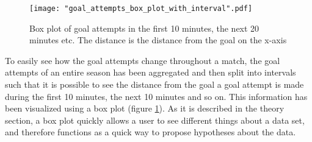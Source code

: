 \documentclass[Report.tex]{subfiles}
\begin{document}
\begin{figure}
\center
\texttt{[image: "goal\_attempts\_box\_plot\_with\_interval".pdf]}
\caption{Box plot of goal attempts in the first 10 minutes, the next 20 minutes etc. The distance is the distance from the goal on the x-axis}
\label{Fig:goal_attempts_box_plot}
\end{figure}

To easily see how the goal attempts change throughout a match, the goal attempts of an entire season has been aggregated and then
split into intervals such that it is possible to see the distance from the goal a goal attempt is made during the first 10 minutes, the next
10 minutes and so on. This information has been visualized using a box plot (figure \ref{Fig:goal_attempts_box_plot}). As it is described in the theory section, a box plot quickly allows a user to see different things about a data set, and therefore functions as a quick way to propose hypotheses about the data.
\end{document}
